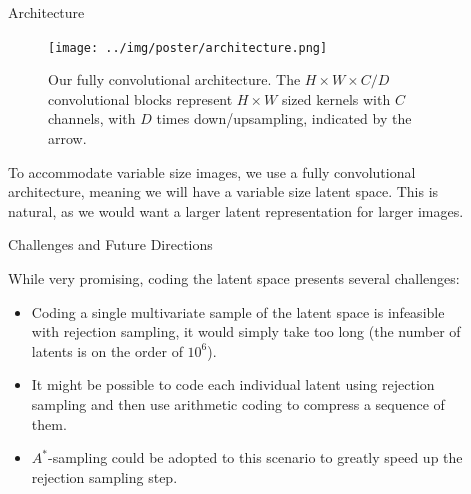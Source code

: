 \documentclass[final]{beamer}
\newlength{\sepwid}
\newlength{\onecolwid}
\newlength{\twocolwid}
\begin{document}
\begin{frame}[t]
\begin{columns}[t]
\begin{column}{\twocolwid}
\begin{columns}[t,totalwidth=\twocolwid]
\begin{column}{\onecolwid}

\end{column} %

\end{columns} %

\end{column} %

\begin{column}{\sepwid}\end{column} %

\begin{column}{\onecolwid} %


\begin{block}{Architecture}
  \begin{figure}[H]
    \centering
    \texttt{[image: ../img/poster/architecture.png]}
    \label{fig:architecture}
    \caption{Our fully convolutional architecture. The $H\times W\times C / D$ convolutional
      blocks represent $H \times W$ sized kernels with $C$ channels, with $D$
      times down/upsampling, indicated by the arrow.}
  \end{figure}

\noindent
To accommodate variable size images, we use a fully convolutional
architecture, meaning we will have a variable size latent space. This is
natural, as we would want a larger latent representation for larger images.

\end{block}

\begin{block}{Challenges and Future Directions}

  While very promising, coding the latent space presents several
  challenges:
  \begin{itemize}
  \item Coding a single multivariate sample of the latent space is infeasible
    with rejection sampling, it would simply take too long (the number of
    latents is on the order of $10^6$).
  \item It might be possible to code each individual latent using rejection sampling and
    then use arithmetic coding to compress a sequence of them. 
  \item $A^*$-sampling could be adopted to this scenario to greatly speed up the
    rejection sampling step.
  \end{itemize}


\end{block}
\end{column}
\end{columns}
\end{frame}
\end{document}
